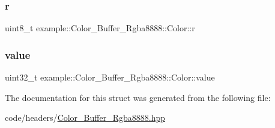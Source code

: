 \subsubsection{\texorpdfstring{r}{r}}
{\footnotesize\ttfamily uint8\+\_\+t example\+::\+Color\+\_\+\+Buffer\+\_\+\+Rgba8888\+::\+Color\+::r}

\mbox{\label{structexample_1_1_color___buffer___rgba8888_1_1_color_aa8c3f5e3038dd7743aab9592023418e4}} 
\subsubsection{\texorpdfstring{value}{value}}
{\footnotesize\ttfamily uint32\+\_\+t example\+::\+Color\+\_\+\+Buffer\+\_\+\+Rgba8888\+::\+Color\+::value}



The documentation for this struct was generated from the following file\+:\begin{DoxyCompactItemize}
\item 
code/headers/\mbox{\hyperlink{_color___buffer___rgba8888_8hpp}{Color\+\_\+\+Buffer\+\_\+\+Rgba8888.\+hpp}}\end{DoxyCompactItemize}
